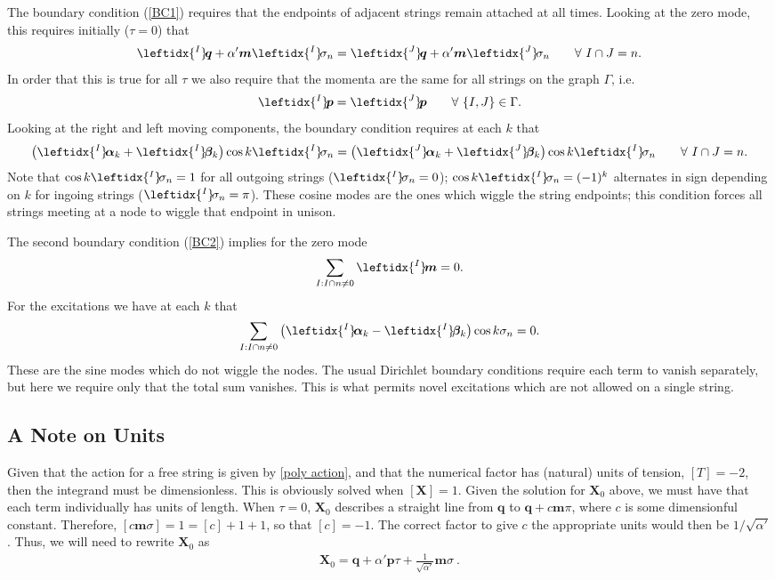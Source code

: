 \documentclass{revtex4}
\newcommand{\be}{\begin{eqnarray}}
\newcommand{\ee}{\end{eqnarray}}
\def\X{\bm{X}}
\def\p{\bm{p}}
\def\q{\bm{q}}
\def\a{\bm{a}}
\def\m{\bm{m}}
\def\b{\bm{b}}
\def\lI{\leftidx{^I} \! }
\def\lJ{\leftidx{^J} \! }
\def\a{\bm{\alpha}}
\def\b{\bm{\beta}}
\begin{document}
The boundary condition (\ref{BC1}) requires that the endpoints of adjacent strings remain attached at all times. Looking at the zero mode, this requires initially ($\tau = 0$) that
\be
\lI \q + \alpha' \m \lI \sigma_n = \lJ \q + \alpha' \m \lJ \sigma_n \qquad \forall \ I \cap J = n .
\ee
In order that this is true for all $\tau$ we also require that the momenta are the same for all strings on the graph $\Gamma$, i.e. 
\be
\lI \p = \lJ \p \qquad \forall \ \{I, J\} \in \Gamma.
\ee
Looking at the right and left moving components, the boundary condition requires at each $k$ that
\be
\left( \lI \a_k + \lI \b_k \right) \cos k \lI \sigma_n = \left( \lJ \a_k  + \lJ \b_k \right) \cos k \lI \sigma_n \qquad \forall \ I \cap J = n.
\ee
Note that $\cos k \lI \sigma_n = 1$ for all outgoing strings ($\lI \sigma_n = 0$); $\cos k \lI \sigma_n = (-1)^k$ alternates in sign depending on $k$ for ingoing strings ($\lI \sigma_n = \pi$).
These cosine modes are the ones which wiggle the string endpoints; this condition forces all strings meeting at a node to wiggle that endpoint in unison.

The second boundary condition (\ref{BC2}) implies for the zero mode
\be
\sum_{I : I \cap n \ne 0} \lI \m = 0 .
\ee
For the excitations we have at each $k$ that
\be
\sum_{I : I \cap n \ne 0} \left( \lI \a_k - \lI \b_k \right)  \cos k \sigma_n = 0. 
\ee
These are the sine modes which do not wiggle the nodes. The usual Dirichlet boundary conditions require each term to vanish separately, but here we require only that the total sum vanishes. This is what permits novel excitations which are not allowed on a single string.


\subsection{A Note on Units}
Given that the action for a free string is given by \eqref{poly action}, and that the numerical factor has (natural) units of tension, $[ T ] = -2$, then the integrand must be dimensionless. This is obviously solved when $[ \X ] = 1$. Given the solution for $\X_0$ above, we must have that each term individually has units of length. When $\tau = 0$, $\X_0$ describes a straight line from $\q$ to $\q + c \m \pi$, where $c$ is some dimensionful constant. Therefore, $[ c \m \sigma ] = 1 = [ c ] + 1 + 1$, so that $[ c ] = -1$. The correct factor to give $c$ the appropriate units would then be $1/\sqrt{\alpha'}$. Thus, we will need to rewrite $\X_0$ as
\be
\X_0 = \q + \alpha' \p \tau + \frac{1}{\sqrt{\alpha'}} \m \sigma \ .
\ee
\end{document}

